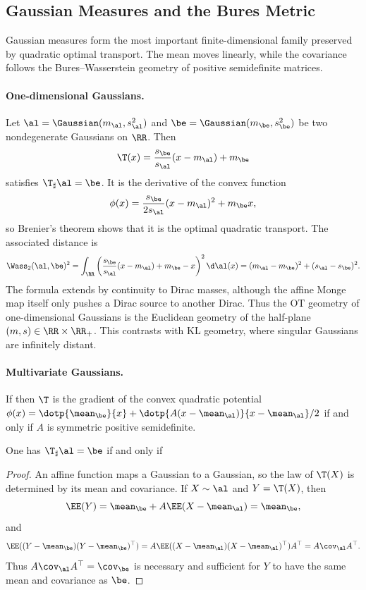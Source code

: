 \subsection{Gaussian Measures and the Bures Metric}
\label{sec-gaussian-bures}

Gaussian measures form the most important finite-dimensional family preserved by quadratic optimal transport. The mean moves linearly, while the covariance follows the Bures--Wasserstein geometry of positive semidefinite matrices.

\paragraph{One-dimensional Gaussians.}

Let $\al=\Gaussian(m_\al,s_\al^2)$ and $\be=\Gaussian(m_\be,s_\be^2)$ be two nondegenerate Gaussians on $\RR$. Then
\[
	\T(x)=\frac{s_\be}{s_\al}(x-m_\al)+m_\be
\]
satisfies $\T_\sharp\al=\be$. It is the derivative of the convex function
\[
	\phi(x)=\frac{s_\be}{2s_\al}(x-m_\al)^2+m_\be x,
\]
so Brenier's theorem shows that it is the optimal quadratic transport. The associated distance is
\[
	\Wass_2(\al,\be)^2
	=
	\int_\RR\left(\frac{s_\be}{s_\al}(x-m_\al)+m_\be-x\right)^2\d\al(x)
	=
	(m_\al-m_\be)^2+(s_\al-s_\be)^2.
\]
The formula extends by continuity to Dirac masses, although the affine Monge map itself only pushes a Dirac source to another Dirac. Thus the OT geometry of one-dimensional Gaussians is the Euclidean geometry of the half-plane $(m,s)\in\RR\times\RR_+$. This contrasts with KL geometry, where singular Gaussians are infinitely distant.

\paragraph{Multivariate Gaussians.}

If
then $\T$ is the gradient of the convex quadratic potential $\phi(x)=\dotp{\mean_\be}{x}+\dotp{A(x-\mean_\al)}{x-\mean_\al}/2$ if and only if $A$ is symmetric positive semidefinite.

\begin{prop}\label{prop-gaussian-affine-push-forward}
	One has $\T_\sharp\al=\be$ if and only if
\end{prop}
\begin{proof}
	An affine function maps a Gaussian to a Gaussian, so the law of $\T(X)$ is determined by its mean and covariance. If $X\sim\al$ and $Y=\T(X)$, then
	\[
		\EE(Y)=\mean_\be+A\EE(X-\mean_\al)=\mean_\be,
	\]
	and
	\[
		\EE((Y-\mean_\be)(Y-\mean_\be)^\top)
		=
		A\EE((X-\mean_\al)(X-\mean_\al)^\top)A^\top
		=
		A\cov_\al A^\top.
	\]
	Thus $A\cov_\al A^\top=\cov_\be$ is necessary and sufficient for $Y$ to have the same mean and covariance as $\be$.
\end{proof}

